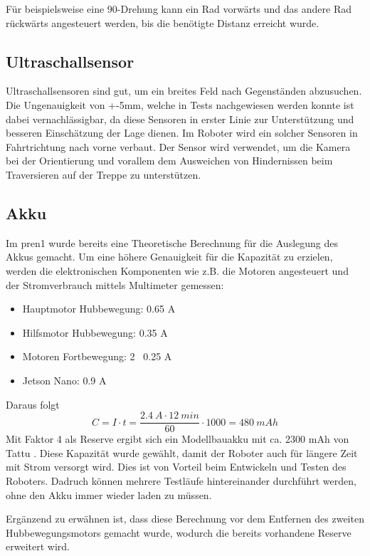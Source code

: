 Für beispielsweise eine 90\textdegree-Drehung kann ein Rad vorwärts und das andere Rad rückwärts angesteuert werden, bis die benötigte Distanz erreicht wurde. 


\subsection{Ultraschallsensor}

Ultraschallsensoren sind gut, um ein breites Feld nach Gegenständen abzusuchen. Die Ungenauigkeit von +-5mm, welche in Tests nachgewiesen werden konnte ist dabei vernachlässigbar, da diese Sensoren in erster Linie zur Unterstützung und besseren Einschätzung der Lage dienen.
Im Roboter wird ein solcher Sensoren in Fahrtrichtung nach vorne verbaut. Der Sensor wird verwendet, um die Kamera bei der Orientierung und vorallem dem Ausweichen von Hindernissen beim Traversieren auf der Treppe zu unterstützen.

\subsection{Akku}
Im \acrshort{pren1} wurde bereits eine Theoretische Berechnung für die Auslegung des Akkus gemacht. Um eine höhere Genauigkeit für die Kapazität zu erzielen, werden die elektronischen Komponenten wie z.B. die Motoren angesteuert und der Stromverbrauch mittels Multimeter gemessen:
\begin{itemize}
    \item Hauptmotor Hubbewegung: 0.65 A
    \item Hilfsmotor Hubbewegung: 0.35 A
    \item Motoren Fortbewegung: 2 \cdot\ 0.25 A
    \item Jetson Nano: 0.9 A
\end{itemize}
Daraus folgt 
\[C = {I\cdot t} = \frac{2.4\ A\cdot 12\ min}{60} \cdot 1000 = 480\ mAh\]
Mit Faktor 4 als Reserve ergibt sich ein Modellbauakku mit ca. 2300 mAh von Tattu \cite{Akku-Modellbau}. Diese Kapazität wurde gewählt, damit der Roboter auch für längere Zeit mit Strom versorgt wird. Dies ist von Vorteil beim Entwickeln und Testen des Roboters. Dadruch können mehrere Testläufe hintereinander durchführt werden, ohne den Akku immer wieder laden zu müssen.

Ergänzend zu erwähnen ist, dass diese Berechnung vor dem Entfernen des zweiten Hubbewegungsmotors gemacht wurde, wodurch die bereits vorhandene Reserve erweitert wird.

\newpage
